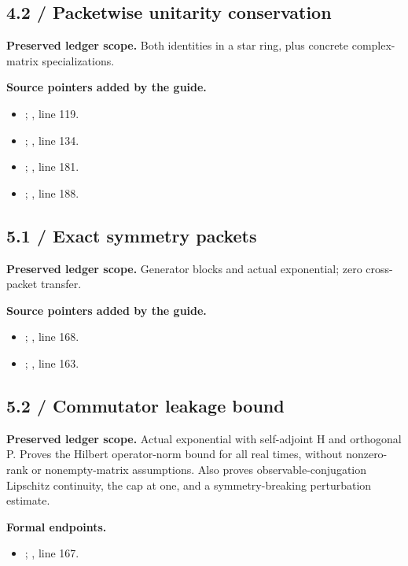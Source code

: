 \subsection{4.2 / Packetwise unitarity conservation}
\label{result:4.2}
\textbf{Preserved ledger scope.} Both identities in a star ring, plus concrete complex-matrix specializations.

\textbf{Source pointers added by the guide.}\begin{itemize}
\item {}; , line 119.
\item {}; , line 134.
\item {}; , line 181.
\item {}; , line 188.
\end{itemize}
\subsection{5.1 / Exact symmetry packets}
\label{result:5.1}
\textbf{Preserved ledger scope.} Generator blocks and actual exponential; zero cross-packet transfer.

\textbf{Source pointers added by the guide.}\begin{itemize}
\item {}; , line 168.
\item {}; , line 163.
\end{itemize}
\subsection{5.2 / Commutator leakage bound}
\label{result:5.2}
\textbf{Preserved ledger scope.} Actual exponential with self-adjoint H and orthogonal P. Proves the Hilbert operator-norm bound for all real times, without nonzero-rank or nonempty-matrix assumptions. Also proves observable-conjugation Lipschitz continuity, the cap at one, and a symmetry-breaking perturbation estimate.

\textbf{Formal endpoints.}\begin{itemize}
\item {}; , line 167.
\end{itemize}
